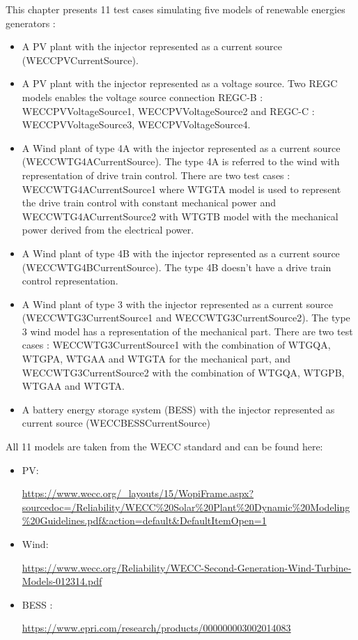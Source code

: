 \documentclass[a4paper, 12pt]{report}
\begin{document}
This chapter presents 11 test cases simulating five models of renewable energies generators :
\begin{itemize}
\item A PV plant with the injector represented as a current source (WECCPVCurrentSource).
\item A PV plant with the injector represented as a voltage source. Two REGC models enables the voltage source connection REGC-B : WECCPVVoltageSource1, WECCPVVoltageSource2 and REGC-C : WECCPVVoltageSource3, WECCPVVoltageSource4.
\item A Wind plant of type 4A with the injector represented as a current source (WECCWTG4ACurrentSource).
The type 4A is referred to the wind with representation of drive train control. There are two test cases : WECCWTG4ACurrentSource1 where WTGTA model is used to represent the drive train control with constant mechanical power and  WECCWTG4ACurrentSource2 with WTGTB model with the mechanical power derived from the electrical power.
\item A Wind plant of type 4B with the injector represented as a current source (WECCWTG4BCurrentSource). The type 4B doesn't have a drive train control representation.
\item A Wind plant of type 3  with the injector represented as a current source (WECCWTG3CurrentSource1 and WECCWTG3CurrentSource2). The type 3 wind model has a representation of the mechanical part. There are two test cases :  WECCWTG3CurrentSource1 with the combination of WTGQA, WTGPA, WTGAA and WTGTA for the mechanical part, and WECCWTG3CurrentSource2 with the combination of WTGQA, WTGPB, WTGAA and WTGTA.
\item A battery energy storage system (BESS) with the injector represented as current source (WECCBESSCurrentSource)
\end{itemize}

All 11 models are taken from the WECC standard and can be found here:
\begin{itemize}
\item PV:

\url{https://www.wecc.org/\_layouts/15/WopiFrame.aspx?sourcedoc=/Reliability/WECC\%20Solar\%20Plant\%20Dynamic\%20Modeling\%20Guidelines.pdf\&action=default\&DefaultItemOpen=1}

\item Wind:

\url{https://www.wecc.org/Reliability/WECC-Second-Generation-Wind-Turbine-Models-012314.pdf}


\item BESS :

\url{https://www.epri.com/research/products/000000003002014083}
\end{itemize}
\end{document}

